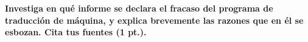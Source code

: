 \textbf{Investiga en qué informe se declara el fracaso del programa de traducción de máquina, y explica brevemente las razones que en él se esbozan. Cita tus fuentes (1 pt.).}